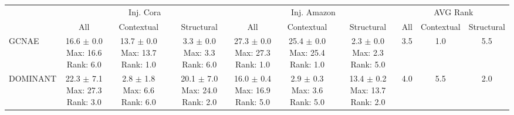 \begin{longtable}{|l|c|c|c|c|c|c|c|c|c|}
\hline
 & \multicolumn{3}{|c|}{Inj. Cora} & \multicolumn{3}{|c|}{Inj. Amazon} & \multicolumn{3}{|c|}{AVG Rank} \\ \cline{2-10}
 & All & Contextual & Structural & All & Contextual & Structural & All & Contextual & Structural \\ \hline
GCNAE & \makecell{ 16.6 $\pm$ 0.0 \\ \scriptsize Max: 16.6 \\ \scriptsize Rank: 6.0 } & \makecell{ 13.7 $\pm$ 0.0 \\ \scriptsize Max: 13.7 \\ \scriptsize Rank: 1.0 } & \makecell{ 3.3 $\pm$ 0.0 \\ \scriptsize Max: 3.3 \\ \scriptsize Rank: 6.0 } & \makecell{ 27.3 $\pm$ 0.0 \\ \scriptsize Max: 27.3 \\ \scriptsize Rank: 1.0 } & \makecell{ 25.4 $\pm$ 0.0 \\ \scriptsize Max: 25.4 \\ \scriptsize Rank: 1.0 } & \makecell{ 2.3 $\pm$ 0.0 \\ \scriptsize Max: 2.3 \\ \scriptsize Rank: 5.0 } & 3.5 & 1.0 & 5.5 \\ \hline 
DOMINANT & \makecell{ 22.3 $\pm$ 7.1 \\ \scriptsize Max: 27.3 \\ \scriptsize Rank: 3.0 } & \makecell{ 2.8 $\pm$ 1.8 \\ \scriptsize Max: 6.6 \\ \scriptsize Rank: 6.0 } & \makecell{ 20.1 $\pm$ 7.0 \\ \scriptsize Max: 24.0 \\ \scriptsize Rank: 2.0 } & \makecell{ 16.0 $\pm$ 0.4 \\ \scriptsize Max: 16.9 \\ \scriptsize Rank: 5.0 } & \makecell{ 2.9 $\pm$ 0.3 \\ \scriptsize Max: 3.6 \\ \scriptsize Rank: 5.0 } & \makecell{ 13.4 $\pm$ 0.2 \\ \scriptsize Max: 13.7 \\ \scriptsize Rank: 2.0 } & 4.0 & 5.5 & 2.0 \\ \hline 

\end{longtable}
